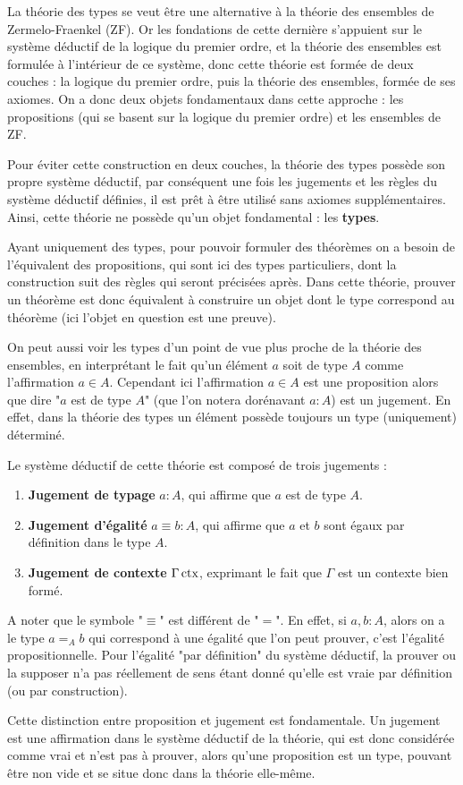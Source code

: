 \documentclass[../../rapport.tex]{subfiles}
\begin{document}
  La théorie des types se veut être une alternative à la théorie des ensembles de Zermelo-Fraenkel (ZF).
  Or les fondations de cette dernière s'appuient sur le système déductif de la logique du premier ordre,
  et la théorie des ensembles est formulée à l'intérieur de ce système, donc cette théorie est formée
  de deux couches : la logique du premier ordre, puis la théorie des ensembles, formée de ses axiomes.
  On a donc deux objets fondamentaux dans cette approche :
  les propositions (qui se basent sur la logique du premier ordre) et les ensembles de ZF.

  Pour éviter cette construction en deux couches, la théorie des types possède son propre système déductif,
  par conséquent une fois les jugements et les règles du système déductif définies,
  il est prêt à être utilisé sans axiomes supplémentaires.
  Ainsi, cette théorie ne possède qu'un objet fondamental : les \textbf{types}.

  Ayant uniquement des types, pour pouvoir formuler des théorèmes on a besoin de l'équivalent des propositions,
  qui sont ici des types particuliers, dont la construction suit des règles qui seront précisées après.
  Dans cette théorie, prouver un théorème est donc équivalent à construire un objet
  dont le type correspond au théorème (ici l'objet en question est une preuve).

  On peut aussi voir les types d'un point de vue plus proche de la théorie des ensembles,
  en interprétant le fait qu'un élément $a$ soit de type $A$ comme l'affirmation $a \in A$.
  Cependant ici l'affirmation $a \in A$ est une proposition alors que dire "$a$ est de type $A$"
  (que l'on notera dorénavant $a : A$) est un jugement. En effet,
  dans la théorie des types un élément possède toujours un type (uniquement) déterminé.

  Le système déductif de cette théorie est composé de trois jugements :
  \begin{enumerate}
    \item \textbf{Jugement de typage} $a : A$, qui affirme que $a$ est de type $A$.
    \item \textbf{Jugement d'égalité} $a \equiv b : A$, qui affirme que $a$ et $b$ sont égaux par définition dans le type $A$.
    \item \textbf{Jugement de contexte} $\Gamma \operatorname{ctx}$, exprimant le fait que $\Gamma$ est un contexte bien formé.
  \end{enumerate}
  A noter que le symbole "$\equiv$" est différent de "$=$".
  En effet, si $a, b : A$, alors on a le type $a =_A b$ qui correspond à une égalité
  que l'on peut prouver, c'est l'égalité propositionnelle.
  Pour l'égalité "par définition" du système déductif, la prouver ou la supposer n'a pas réellement de sens
  étant donné qu'elle est vraie par définition (ou par construction).

  Cette distinction entre proposition et jugement est fondamentale.
  Un jugement est une affirmation dans le système déductif de la théorie, qui est donc considérée comme vrai et n'est pas à prouver,
  alors qu'une proposition est un type, pouvant être non vide et se situe donc dans la théorie elle-même.
\end{document}
